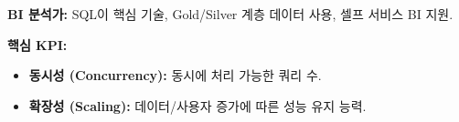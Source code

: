 \documentclass[11pt,a4paper]{article}
\theoremstyle{definition}
\begin{document}
\begin{summarybox}[title=CSCI103 Lecture 6 핵심 요약]
\textbf{BI 분석가:} SQL이 핵심 기술, Gold/Silver 계층 데이터 사용, 셀프 서비스 BI 지원.

\textbf{핵심 KPI:}
\begin{itemize}
    \item \textbf{동시성 (Concurrency):} 동시에 처리 가능한 쿼리 수.
    \item \textbf{확장성 (Scaling):} 데이터/사용자 증가에 따른 성능 유지 능력.
\end{itemize}
\end{summarybox}
\end{document}
